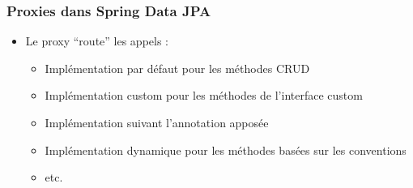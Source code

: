 \begin{frame}[fragile]
 \frametitle{Proxies dans Spring Data JPA}
 \begin{itemize}
  \item Le proxy ``route'' les appels :
  \begin{itemize}
   \item Implémentation par défaut pour les méthodes CRUD
   \item Implémentation custom pour les méthodes de l'interface custom
   \item Implémentation suivant l'annotation apposée
   \item Implémentation dynamique pour les méthodes basées sur les conventions
   \item etc.
  \end{itemize}
 \end{itemize}

\end{frame}